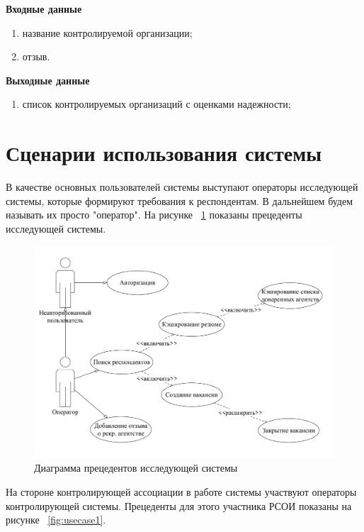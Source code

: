 \textbf{Входные данные}
\begin{enumerate}
\item название контролируемой организации;
\item отзыв.
\end{enumerate}

\textbf{Выходные данные}
\begin{enumerate}
\item список контролируемых организаций с оценками надежности;
\end{enumerate}

\section{Сценарии использования системы}
В качестве основных пользователей системы выступают операторы исследующей системы, которые формируют требования к респондентам. В дальнейшем будем называть их просто "оператор". На рисунке ~\ref{fig:usecase} показаны прецеденты исследующей системы. 

\begin{figure}[ht]
  \centering
  \includegraphics[width=\textwidth]{include/usecase.pdf}
  \caption{Диаграмма прецедентов исследующей системы}
  \label{fig:usecase}
\end{figure}

На стороне контролирующей ассоциации в работе системы участвуют операторы контролирующей системы. Прецеденты для этого участника РСОИ показаны на рисунке ~\ref{fig:usecase1}.

